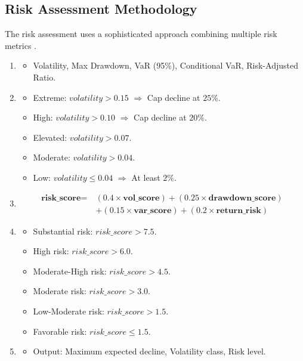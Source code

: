 \documentclass[3p,times,procedia]{elsarticle}
\begin{document}
\subsection{Risk Assessment Methodology}
The risk assessment uses a sophisticated approach combining multiple risk metrics \cite{Jorion2001}.
\begin{enumerate}
    \item {}
    \begin{itemize}
        \item Volatility, Max Drawdown, VaR (95\%), Conditional VaR, Risk-Adjusted Ratio.
    \end{itemize}

    \item {}
    \begin{itemize}
        \item Extreme: $volatility > 0.15$  $\Rightarrow$ Cap decline at $25\%$.
        \item High: $volatility > 0.10$  $\Rightarrow$ Cap decline at $20\%$.
        \item Elevated: $volatility > 0.07$.
        \item Moderate: $volatility > 0.04$.
        \item Low: $volatility \leq 0.04$ $\Rightarrow$ At least $2\%$.
    \end{itemize}

    \item {}
\begin{align}
\textbf{risk\_score} =\ & (0.4 \times \textbf{vol\_score}) + (0.25 \times \textbf{drawdown\_score}) \nonumber \\
& + (0.15 \times \textbf{var\_score}) + (0.2 \times \textbf{return\_risk})
\end{align}

    \item {}
    \begin{itemize}
        \item Substantial risk: $risk\_score > 7.5$.
        \item High risk: $risk\_score > 6.0$.
        \item Moderate-High risk: $risk\_score > 4.5$.
        \item Moderate risk: $risk\_score > 3.0$.
        \item Low-Moderate risk: $risk\_score > 1.5$.
        \item Favorable risk: $risk\_score \leq 1.5$.
    \end{itemize}

    \item {}
    \begin{itemize}
        \item Output: Maximum expected decline, Volatility class, Risk level.
    \end{itemize}

\end{enumerate}
\end{document}
